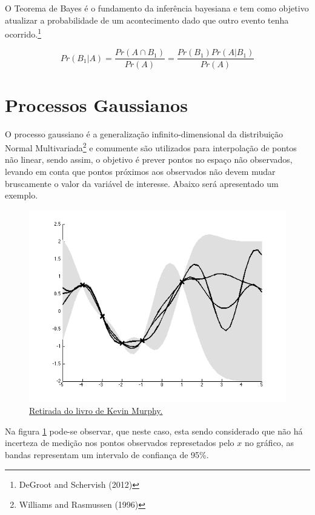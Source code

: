 \documentclass[
	12pt,				%
	a4paper,		%
	oneside,    %
	chapter=TITLE,		   %
	section=TITLE,		   %
	subsection=TITLE,	   %
	subsubsection=TITLE, %
	english,			%
	french,				%
	spanish,			%
	brazil,				%
]{abntex2}
\begin{document}
O Teorema de Bayes é o fundamento da inferência bayesiana e tem como
objetivo atualizar a probabilidade de um acontecimento dado que outro
evento tenha ocorrido.\footnote{DeGroot and Schervish (2012)}

\[
Pr(B_1|A) = \frac{Pr(A \cap B_1)}{Pr(A)} = \frac{Pr(B_1)Pr(A|B_1)}{Pr(A)}
\]

\hypertarget{processos-gaussianos}{%
\section{Processos Gaussianos}\label{processos-gaussianos}}

O processo gaussiano é a generalização infinito-dimensional da
distribuição Normal Multivariada\footnote{Williams and Rasmussen (1996)}
e comumente são utilizados para interpolação de pontos não linear, sendo
assim, o objetivo é prever pontos no espaço não observados, levando em
conta que pontos próximos aos observados não devem mudar bruscamente o
valor da variável de interesse. Abaixo será apresentado um exemplo.

\begin{figure}
\centering
\includegraphics[width=\textwidth,height=0.3\textheight]{fig/gp.png}
\caption{\href{https://github.com/probml/pmtk3/blob/30d7a1952f3979b16e92dbfa4cd1ce0e402cf7d8/docs/demoOutput/bookDemos/(15)-Gaussian_processes/gprDemoNoiseFree_02.png}{Retirada
do livro de Kevin Murphy.\label{gp}}}
\end{figure}

Na figura \ref{gp} pode-se observar, que neste caso, esta sendo
considerado que não há incerteza de medição nos pontos observados
represetados pelo \(x\) no gráfico, as bandas representam um intervalo
de confiança de 95\%.
\end{document}
